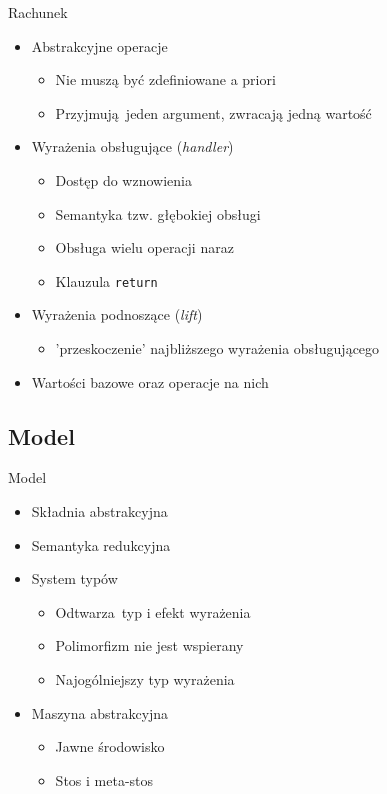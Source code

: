 \documentclass{beamer}
\begin{document}
\begin{frame}{Rachunek}
  \begin{itemize}
    \item Abstrakcyjne operacje
    \begin{itemize}
      \item Nie muszą być zdefiniowane a priori
      \item Przyjmują jeden argument, zwracają jedną wartość
    \end{itemize}
    \pause
    \item Wyrażenia obsługujące (\emph{handler})
    \begin{itemize}
      \item Dostęp do wznowienia
      \item Semantyka tzw. głębokiej obsługi
      \item Obsługa wielu operacji naraz
      \item Klauzula \texttt{return}
    \end{itemize}
    \pause
    \item Wyrażenia podnoszące (\emph{lift})
    \begin{itemize}
      \item 'przeskoczenie' najbliższego wyrażenia obsługującego
    \end{itemize}
    \pause
    \item Wartości bazowe oraz operacje na nich
  \end{itemize}
\end{frame}

\subsection{Model}
\begin{frame}{Model}
  \begin{itemize}
    \item Składnia abstrakcyjna
    \item Semantyka redukcyjna
    \pause
    \item System typów
    \begin{itemize}
      \item Odtwarza typ i efekt wyrażenia
      \item Polimorfizm nie jest wspierany
      \item Najogólniejszy typ wyrażenia
    \end{itemize}
    \pause
    \item Maszyna abstrakcyjna
    \begin{itemize}
      \item Jawne środowisko
      \item Stos i meta-stos
    \end{itemize}
  \end{itemize}
\end{frame}
\end{document}
